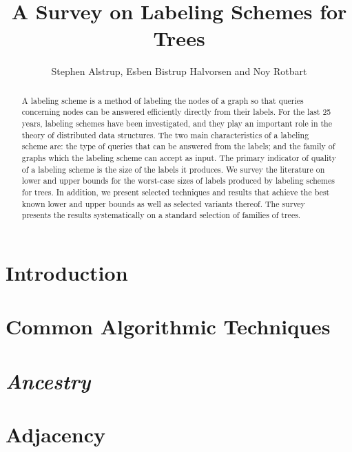 \documentclass[prodmode,acmcsur]{acmsmall}
\newcommand{\ancestry}{\emph{Ancestry}\xspace}
\begin{document}
\title{A Survey on Labeling Schemes for Trees}
\author{Stephen Alstrup, Esben Bistrup Halvorsen and Noy Rotbart}

\begin{abstract}
A labeling scheme is a method of labeling the nodes of a graph so that queries concerning nodes can be answered efficiently directly from their labels. 
For the last 25 years, labeling schemes have been investigated, and they play an important role in the theory of distributed data structures.
The two main characteristics of a labeling scheme are: the type of queries that can be answered from the labels; and the family of graphs which the labeling scheme can accept as input. 
The primary indicator of quality of a labeling scheme is the size of the labels  it produces.
We survey the literature on   lower and upper bounds for the worst-case sizes of labels produced by labeling schemes for trees.
In addition, we present selected  techniques and results that achieve the best known lower and upper bounds as well as selected variants thereof.
The survey presents the results systematically on a standard selection of families of trees. 
\end{abstract}



\begin{bottomstuff}
\end{bottomstuff}

\maketitle

\section{Introduction}


\section{Common Algorithmic Techniques}\label{section:techniques}



\section{\ancestry}\label{section:Anc}

%

\section{Adjacency}\label{section:Adj}

\end{document}
